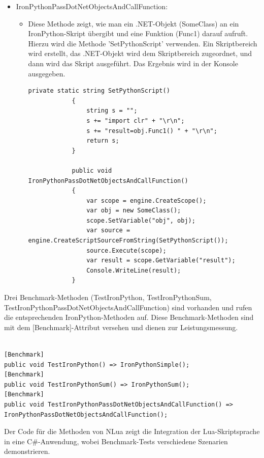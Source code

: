 \begin{itemize}
\begin{itemize}
\begin{lstlisting}[language={[Sharp]C}, caption=IronPythonSum, label=lst:imp:ipySum]
        public void IronPythonSum()
        {
            var scope = engine.CreateScope();
            var source = engine.CreateScriptSourceFromString("def sum(x,y):\r\n\treturn x+y\n\r\n\r\rresult = sum(3,3)");
            source.Execute(scope);
            var result = scope.GetVariable("result");
            Console.WriteLine(result);
        }
        \end{lstlisting}
    \end{itemize}
    \item IronPythonPassDotNetObjectsAndCallFunction:
    \begin{itemize}
        \item Diese Methode zeigt, wie man ein .NET-Objekt (SomeClass) an ein IronPython-Skript übergibt und eine Funktion (Func1) darauf aufruft.
        Hierzu wird die Methode 'SetPythonScript' verwenden.
        Ein Skriptbereich wird erstellt, das .NET-Objekt wird dem Skriptbereich zugeordnet, und dann wird das Skript ausgeführt. Das Ergebnis wird in der Konsole ausgegeben.
        \begin{lstlisting}[language={[Sharp]C}, caption=IronPythonObject, label=lst:imp:ipyObject]
            private static string SetPythonScript()
            {
                string s = "";
                s += "import clr" + "\r\n";
                s += "result=obj.Func1() " + "\r\n";
                return s;
            }

            public void IronPythonPassDotNetObjectsAndCallFunction() 
            {
                var scope = engine.CreateScope();
                var obj = new SomeClass();
                scope.SetVariable("obj", obj);
                var source = engine.CreateScriptSourceFromString(SetPythonScript());
                source.Execute(scope);
                var result = scope.GetVariable("result");
                Console.WriteLine(result);
            }
        \end{lstlisting}
        
    \end{itemize}
\end{itemize}
\newpage
Drei Benchmark-Methoden (TestIronPython, TestIronPythonSum, TestIronPythonPassDotNetObjectsAndCallFunction) sind vorhanden und rufen die entsprechenden IronPython-Methoden auf. Diese Benchmark-Methoden sind mit dem [Benchmark]-Attribut versehen und dienen zur Leistungsmessung.
\begin{lstlisting}[language={[Sharp]C}, caption=IronPythonBenchmark, label=lst:imp:ipyBench]

[Benchmark]
public void TestIronPython() => IronPythonSimple();
[Benchmark]
public void TestIronPythonSum() => IronPythonSum();
[Benchmark]
public void TestIronPythonPassDotNetObjectsAndCallFunction() => IronPythonPassDotNetObjectsAndCallFunction();

\end{lstlisting}
Der Code für die Methoden von NLua zeigt die Integration der Lua-Skriptsprache in eine C\#-Anwendung, wobei Benchmark-Tests verschiedene Szenarien demonstrieren.

